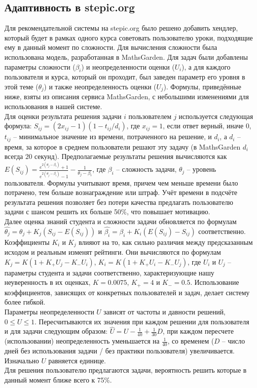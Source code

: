 \documentclass[14pt]{matmex-diploma}
\begin{document}
\subsection{Адаптивность в stepic.org}
Для рекомендательной системы на stepic.org было решено добавить хендлер, который будет в рамках одного курса советовать пользователю уроки, подходящие ему в данный момент по сложности. Для вычисления сложности была использована модель, разработанная в MathsGarden. Для задач были добавлены параметры сложности ($\beta_i$) и неопределенности оценки ($U_i$), а для каждого пользователя и курса, который он проходит, был заведен параметр его уровня в этой теме ($\theta_j$) и также неопределенность оценки ($U_j$). Формулы, приведённые ниже, взяты из описания сервиса MathsGarden\cite{mathsgarden}, с небольшими изменениями для использования в нашей системе.
\\\indent Для оценки результата решения задачи $i$ пользователем $j$ используется следующая формула: $S_{ij} = (2 x_{ij} - 1)(1 - t_{ij} / d_i) $, где $x_{ij} = 1$, если ответ верный, иначе $0$, $t_{ij}$ -- минимальное значение из времени, потраченного на решение, и $d_i$, а $d_i$ -- время, за которое в среднем пользователи решают эту задачу (в MathsGarden $d_i$ всегда $20$ секунд). Предполагаемые результаты решения вычисляются как $E(S_{ij}) =  \frac{e^{2 (\theta_j - \beta_i)} + 1}{e^{2 (\theta_j - \beta_i)} - 1} - \frac{1}{\theta_j - \beta_i}$, где $\beta_i$ -- сложность задачи, $\theta_j$ -- уровень пользователя\cite{time_scoring_rules}. Формулы учитывают время, причем чем меньше времени было потрачено, тем больше вознаграждение или штраф. Учёт времени в подсчёте результата решения позволяет без потери качества предлагать пользователю задачи с шансом решить их больше 50\%, что повышает мотивацию\cite{mathsgarden}\cite{ericsson2006influence}.
\\\indent Далее оценка знаний студента и сложности задачи обновляется по формулам $\hat{\theta_j} = \theta_j + K_j(S_{ij} - E(S_{ij}))$ и  $\hat{\beta_i} = \beta_i + K_i(E(S_{ij}) - S_{ij})$ соответственно. Коэффициенты $K_i$ и $K_j$ влияют на то, как сильно различия между предсказанным исходом и реальным изменят рейтинги. Они вычисляются по формулам  $K_j = K(1 + K_+ U_j - K_- U_i)$, $K_i = K(1 + K_+ U_i - K_- U_j)$, где $U_i$ и $U_j$ -- параметры студента и задачи соответственно, характеризующие нашу неуверенность в их оценках, $K = 0.0075$, $K_+ = 4$ и $K_- = 0.5$\cite{mathsgarden}. Использование коэффициентов, зависящих от конкретных пользователей и задач, делает систему более гибкой\cite{glickman95}.
\\\indent Параметры неопределенности $U$ зависят от частоты и давности решений, $0 \le U \le 1$. Пересчитываются их значения при каждом решении для пользователя и для задачи следующим образом: $\hat{U} = U - \frac{1}{40} + \frac{1}{30} D$, при каждом пересчете (использовании) неопределенность уменьшается на $\frac{1}{40}$, со временем ($D$ -- число дней без использования задачи / без практики пользователя) увеличивается. Изначально $U$ равняется единице.
\\\indent Для решения пользователю предлагаются задачи, вероятность решить которые в данный момент ближе всего к 75\%.
\end{document}
